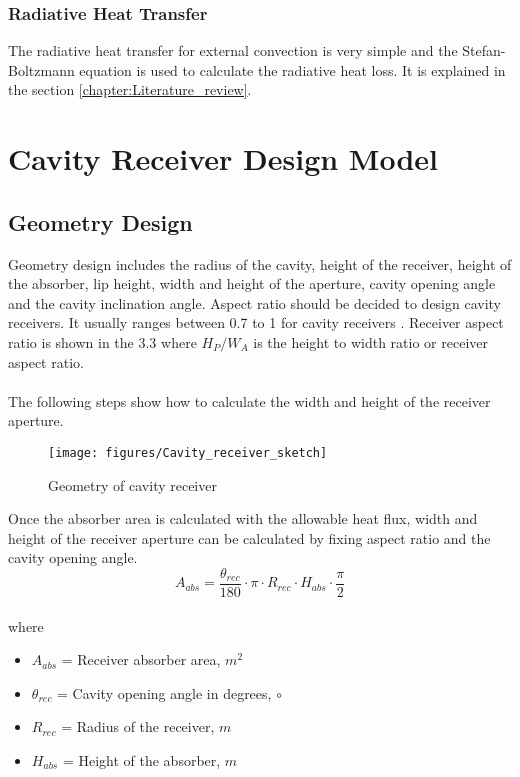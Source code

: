 \subsubsection{Radiative Heat Transfer}
The radiative heat transfer for external convection is very simple and the Stefan-Boltzmann equation is used to calculate the radiative heat loss. It is explained in the section \ref{chapter:Literature_review}.
\section{Cavity Receiver Design Model}
\subsection{Geometry Design}
Geometry design includes the radius of the cavity, height of the receiver, height of the absorber, lip height, width and height of the aperture, cavity opening angle and the cavity inclination angle. Aspect ratio should be decided to design cavity receivers. It usually ranges between 0.7 to 1 for cavity receivers \cite{Falcone.1986}. Receiver aspect ratio is shown in the \figurename{ 3.3} where ${H_P}/{W_A}$ is the height to width ratio or receiver aspect ratio. \\\\
The following steps show how to calculate the width and height of the receiver aperture.
 \begin{figure}[h]
 	\texttt{[image: figures/Cavity\_receiver\_sketch]}
 	\centering
 	\caption{Geometry of cavity receiver \cite{Feierabend.2010}}	
 \end{figure}
Once the absorber area is calculated with the allowable heat flux, width and height of the receiver aperture can be calculated by fixing aspect ratio and the cavity opening angle. \\
\begin{equation}
	A_{abs} = \frac {\theta_{rec}}{180} \cdot \pi \cdot R_{rec} \cdot H_{abs} \cdot \frac {\pi}{2}
\end{equation}\\
where 
\begin{itemize}
	\item $A_{abs}$ = Receiver absorber area, $m^2$
	\item $\theta_{rec}$ = Cavity opening angle in degrees, $\circ$ 
	\item $R_{rec}$ = Radius of the receiver, $m$
	\item $H_{abs}$ = Height of the absorber, $m$
\end{itemize}
